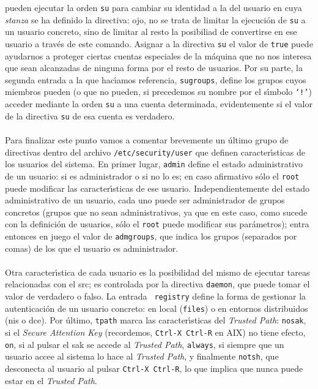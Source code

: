 pueden ejecutar la orden {\tt su} para cambiar su identidad a la del usuario en
cuya {\it stanza} se ha definido la directiva: ojo, no se trata de limitar la
ejecuci\'on de {\tt su} a un usuario concreto, sino de limitar al resto la 
posibiliad de convertirse en ese usuario a trav\'es de este comando. Asignar a
la directiva {\tt su} el valor de {\tt true} puede ayudarnos a proteger ciertas
cuentas especiales de la m\'aquina que no nos interesa que sean alcanzadas de
ninguna forma por el resto de usuarios. Por su parte, la segunda entrada a la
que hac\'{\i}amos referencia, {\tt sugroups}, define los grupos cuyos miembros
pueden (o que no pueden, si precedemos su nombre por el s\'{\i}mbolo {\tt `!'})
acceder mediante la orden {\tt su} a una cuenta determinada, evidentemente si
el valor de la directiva {\tt su} de esa cuenta es verdadero.\\
\\Para finalizar este punto vamos a comentar brevemente un \'ultimo grupo de
directivas dentro del archivo {\tt /etc/security/user} que definen 
caracter\'{\i}sticas de los usuarios del sistema. En primer lugar, {\tt admin}
define el estado administrativo de un usuario: si es administrador o si no lo
es; en caso afirmativo s\'olo el {\tt root} puede modificar las 
caracter\'{\i}sticas de ese usuario. Independientemente del estado 
administrativo de un usuario, cada uno puede ser administrador de grupos 
concretos (grupos que no sean administrativos, ya que en este caso, como sucede
con la definici\'on de usuarios, s\'olo el {\tt root} puede modificar sus 
par\'ametros); entra entonces en juego el valor de {\tt admgroups}, que indica
los grupos (separados por comas) de los que el usuario es administrador.\\
\\Otra caracter\'{\i}stica de cada usuario es la posibilidad del mismo de 
ejecutar tareas relacionadas con el {\sc src}; es controlada por la directiva 
{\tt daemon}, que puede tomar el valor de verdadero o falso. La entrada {\tt 
registry} define la forma de gestionar la autenticaci\'on de un usuario 
concreto: en
local ({\tt files}) o en entornos distribuidos ({\sc nis} o {\sc dce}). Por
\'ultimo, {\tt tpath} marca las caracter\'{\i}sticas del {\it Trusted Path}: 
{\tt nosak}, si el {\it Secure Attention Key} (recordemos, {\tt Ctrl-X 
Ctrl-R} en AIX) no tiene efecto, {\tt on}, si al pulsar el {\sc sak} se accede
al {\it Trusted Path}, {\tt always}, si siempre que un usuario accee al sistema
lo hace al {\it Trusted Path}, y finalmente {\tt notsh}, que desconecta al 
usuario al pulsar {\tt Ctrl-X Ctrl-R}, lo que implica que nunca puede estar
en el {\it Trusted Path}.
